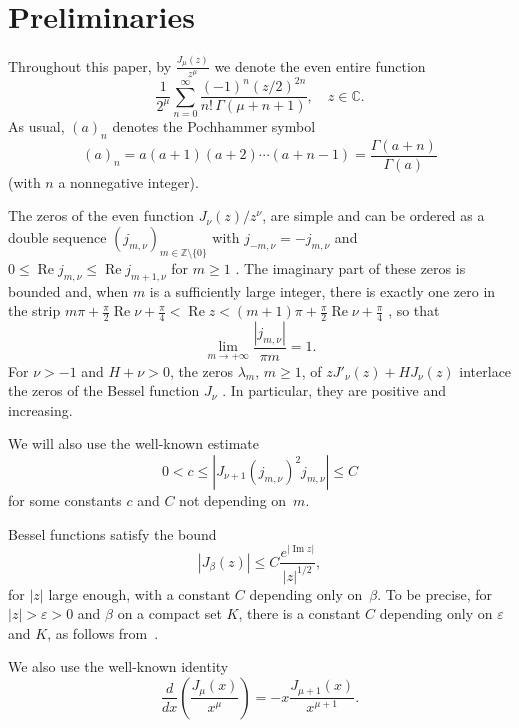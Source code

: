 \documentclass[12pt,leqno]{amsart}
\numberwithin{equation}{section}
\theoremstyle{plain}
\newcommand{\ZZ}{\mathbb{Z}}
\newcommand{\CC}{\mathbb{C}}
\newcommand{\eps}{\varepsilon}
\renewcommand{\Im}{\operatorname{Im}}
\renewcommand{\Re}{\operatorname{Re}}
\begin{document}
\section{Preliminaries}

Throughout this paper, by $\frac{J_{\mu}(z)}{z^\mu}$ we denote the even entire function
\begin{equation*}
   \frac{1}{2^\mu}
   \sum_{n=0}^{\infty} \frac{(-1)^n (z/2)^{2n}}{n! \, \Gamma(\mu+n+1)},
   \quad z \in \CC.
\end{equation*}
As usual, $(a)_n$ denotes the Pochhammer symbol
\[
  (a)_n = a(a+1)(a+2) \cdots (a+n-1) = \frac{\Gamma(a+n)}{\Gamma(a)}
\]
(with $n$ a nonnegative integer).

The zeros of the even function $J_{\nu}(z)/z^{\nu}$, are simple and can be ordered as a double sequence $(j_{m,\nu})_{m\in \ZZ \setminus\{0\}}$ with $j_{-m,\nu} = -j_{m,\nu}$ and $0 \leq \Re j_{m,\nu} \leq \Re j_{m+1,\nu}$ for $m \geq 1$ \cite[\S\,15.41, p.~497]{Wat}. The imaginary part of these zeros is bounded and, when $m$ is a sufficiently large integer, there is exactly one zero in the strip $m\pi + \frac{\pi}{2} \Re \nu + \frac{\pi}{4} < \Re z < (m+1)\pi + \frac{\pi}{2} \Re \nu + \frac{\pi}{4}$ \cite[\S\,15.4, p.~497]{Wat}, so that
\[
   \lim_{m\to+\infty} \frac{|j_{m,\nu}|}{\pi m} = 1.
\]
For $\nu>-1$ and $H+\nu>0$, the zeros $\lambda_m$, $m\ge 1$, of $zJ'_\nu(z)+HJ_\nu(z)$ interlace the zeros of the Bessel function $J_\nu$ \cite[\S\,15.23, p.~480]{Wat}. In particular, they are positive and increasing.

We will also use the well-known estimate
\begin{equation*}
   0 < c \leq |J_{\nu + 1}(j_{m,\nu})^2 j_{m,\nu}| \leq C
\end{equation*}
for some constants $c$ and $C$ not depending on~$m$.

Bessel functions satisfy the bound
\begin{equation*}
   |J_\beta(z)| \leq C \frac{e^{|\Im z|}}{|z|^{1/2}},
\end{equation*}
for $|z|$ large enough, with a constant $C$ depending only on~$\beta$.
To be precise, for $|z| > \eps > 0$ and $\beta$ on a compact set $K$, there is a constant $C$ depending only on $\eps$ and $K$, as follows from~\cite[Eq.~10.4.4 and \S\,10.17(iv)]{OlMa-NIST}.

We also use the well-known identity
\begin{equation}
\label{fdbc}
\frac{d}{dx}\left(\frac{J_{\mu}(x)}{x^\mu}\right) = -x\frac{J_{\mu+1}(x)}{x^{\mu+1}}.
\end{equation}
\end{document}
